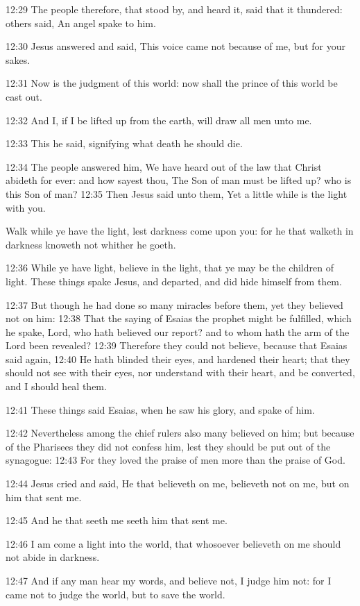 12:29 The people therefore, that stood by, and heard it, said that it thundered: others said, An angel spake to him.

12:30 Jesus answered and said, This voice came not because of me, but for your sakes.

12:31 Now is the judgment of this world: now shall the prince of this world be cast out.

12:32 And I, if I be lifted up from the earth, will draw all men unto me.

12:33 This he said, signifying what death he should die.

12:34 The people answered him, We have heard out of the law that Christ abideth for ever: and how sayest thou, The Son of man must be lifted up? who is this Son of man?  12:35 Then Jesus said unto them, Yet a little while is the light with you.

Walk while ye have the light, lest darkness come upon you: for he that walketh in darkness knoweth not whither he goeth.

12:36 While ye have light, believe in the light, that ye may be the children of light. These things spake Jesus, and departed, and did hide himself from them.

12:37 But though he had done so many miracles before them, yet they believed not on him: 12:38 That the saying of Esaias the prophet might be fulfilled, which he spake, Lord, who hath believed our report? and to whom hath the arm of the Lord been revealed?  12:39 Therefore they could not believe, because that Esaias said again, 12:40 He hath blinded their eyes, and hardened their heart; that they should not see with their eyes, nor understand with their heart, and be converted, and I should heal them.

12:41 These things said Esaias, when he saw his glory, and spake of him.

12:42 Nevertheless among the chief rulers also many believed on him; but because of the Pharisees they did not confess him, lest they should be put out of the synagogue: 12:43 For they loved the praise of men more than the praise of God.

12:44 Jesus cried and said, He that believeth on me, believeth not on me, but on him that sent me.

12:45 And he that seeth me seeth him that sent me.

12:46 I am come a light into the world, that whosoever believeth on me should not abide in darkness.

12:47 And if any man hear my words, and believe not, I judge him not: for I came not to judge the world, but to save the world.

